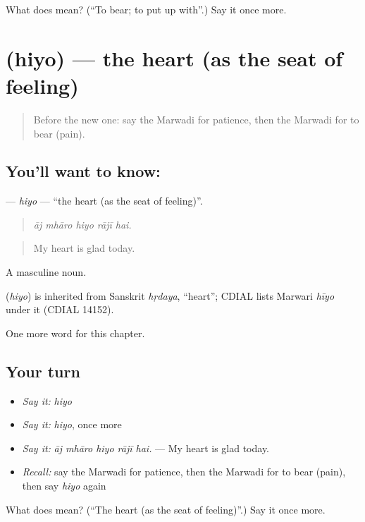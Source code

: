 \begin{tcolorbox}[breakable,colback=teal!4,colframe=teal!35!black,title={Before you move on}]
What does  mean? (\textquotedblleft{}To bear; to put up with\textquotedblright{}.) Say it once more.
\end{tcolorbox}
\section[\texorpdfstring{\mw{हियो} (hiyo)}{हियो (hiyo)}]{ (hiyo) — the heart (as the seat of feeling)}

\label{lesson:MW-C258-hiyo}



\begin{quote}
Before the new one: say the Marwadi for patience, then the Marwadi for to bear (pain).
\end{quote}

\subsection*{You'll want to know: }
\textbf{} — \emph{hiyo} — \textquotedblleft{}the heart (as the seat of feeling)\textquotedblright{}.

\begin{quote}
    
\end{quote}

\begin{quote}
\emph{āj mhāro hiyo rājī hai.}
\end{quote}

\begin{quote}
My heart is glad today.
\end{quote}

A masculine noun.

\begin{cousinweb}
\textbf{} (\emph{hiyo}) is inherited from Sanskrit \emph{hṛdaya}, \textquotedblleft{}heart\textquotedblright{}; CDIAL lists Marwari \emph{hīyo} under it (CDIAL 14152).
\end{cousinweb}

\begin{grammarlens}[title={What you've built}]
One more word for this chapter.
\end{grammarlens}

\subsection*{Your turn}
\begin{itemize}
\raggedright
  \item \emph{Say it:} \emph{hiyo}
  \item \emph{Say it:} \emph{hiyo}, once more
  \item \emph{Say it:} \emph{āj mhāro hiyo rājī hai.} — My heart is glad today.
  \item \emph{Recall:} say the Marwadi for patience, then the Marwadi for to bear (pain), then say \emph{hiyo} again
\end{itemize}

\begin{tcolorbox}[breakable,colback=teal!4,colframe=teal!35!black,title={Before you move on}]
What does  mean? (\textquotedblleft{}The heart (as the seat of feeling)\textquotedblright{}.) Say it once more.
\end{tcolorbox}
